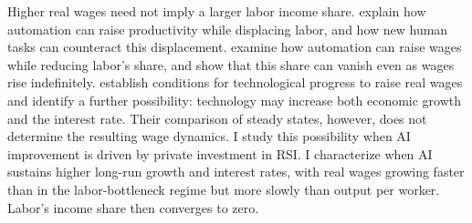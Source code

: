 Higher real wages need not imply a larger labor income share.
\citet{acemoglurestrepo2019} explain how automation can raise productivity
while displacing labor, and how new human tasks can counteract this
displacement. \citet{autorkausik2026} examine how automation can raise
wages while reducing labor's share, and \citet{raymookherjee2022} show
that this share can vanish even as wages rise indefinitely.
\citet{casellimanning2019} establish conditions for technological
progress to raise real wages and identify a further possibility:
technology may increase both economic growth and the interest rate.
Their comparison of steady states, however, does not determine the
resulting wage dynamics. I study this possibility when AI improvement
is driven by private investment in RSI. I characterize when AI
sustains higher long-run growth and interest rates, with real wages
growing faster than in the labor-bottleneck regime but more slowly
than output per worker. Labor's income share then converges to zero.

